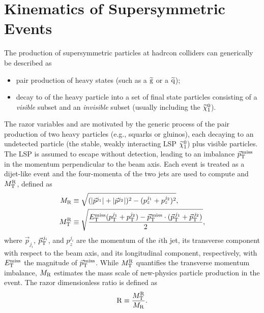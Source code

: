 \section{Kinematics of Supersymmetric Events}
\label{sec:kinematic}

The production of supersymmetric particles at hadrcon colliders can generically be
described as
\begin{itemize}
\item pair production of heavy states (such as a $\mathrm{\widetilde{g}}$ or a $\mathrm{\widetilde{q}}$);
\item decay to of the heavy particle into a set of final state
  particles consisting of a \emph{visible} subset and an
  \emph{invisible} subset (usually including the $\widetilde{\chi}^{0}_1$).
\end{itemize}


The razor variables \MR and  \Rtwo are motivated by the generic process of the pair production of two
heavy particles (e.g., squarks or gluinos), each decaying to an
undetected particle (the stable, weakly interacting LSP $\widetilde{\chi}^{0}_1$)
plus visible particles. The LSP is assumed to escape without
detection, leading to an imbalance ${\vec p}_{\mathrm{T}}^{\kern1pt\text{miss}}$ in the momentum
perpendicular to the beam axis. Each event is treated as a dijet-like event
and the four-momenta of the two jets are used to compute \MR and $M_\mathrm{T}^\mathrm{R}$, defined as
\begin{align}
 \label{eq:MRstar}
 M_\mathrm{R} &\equiv
 \sqrt{
(\lvert \vec{p}^{j_{1}} \rvert+\lvert \vec{p}^{j_{2}} \rvert)^2 -({p}^{j_1}_z+{p}^{j_2}_z)^2},\\
M_\mathrm{T}^\mathrm{R} &\equiv \sqrt{ \frac{E_{\mathrm{T}}^{\text{miss}}(p_{\mathrm{T}}^{j_1}+p_{\mathrm{T}}^{j_2}) -
{\vec p}_{\mathrm{T}}^{\kern1pt\text{miss}} \cdot
 ({\vec p}_{\mathrm{T}}^{\,j_1}+{\vec p}_{\mathrm{T}}^{\,j_2}) }{2}},
\end{align}
where $\vec{p}_{j_i}$, ${\vec p}_{\mathrm{T}}^{\,j_i}$, and
$p^{j_i}_z$ are the momentum of the $i$th jet, its
transverse component with respect to the beam axis, and its
longitudinal component, respectively, with $E_{\mathrm{T}}^{\text{miss}}$ the magnitude of ${\vec p}_{\mathrm{T}}^{\kern1pt\text{miss}}$. While
$M_\mathrm{T}^\mathrm{R}$ quantifies the transverse momentum imbalance,
$M_\mathrm{R}$ estimates the mass scale of new-physics particle
production in the event. The razor dimensionless ratio is defined as
\begin{equation}
\mathrm{R} \equiv \frac{M_\mathrm{T}^\mathrm{R}}{M_\mathrm{R}}.
\end{equation}